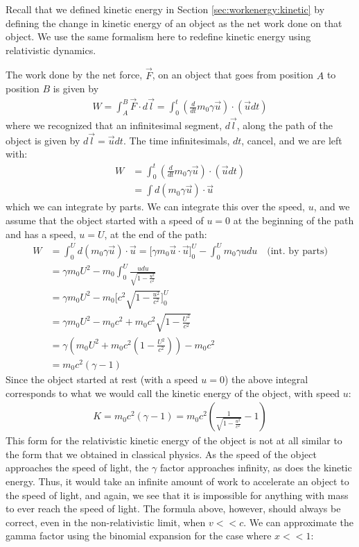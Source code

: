 Recall that we defined kinetic energy in Section \ref{sec:workenergy:kinetic} by defining the change in kinetic energy of an object as the net work done on that object. We use the same formalism here to redefine kinetic energy using relativistic dynamics.

The work done by the net force, $\vec F$, on an object that goes from position $A$ to position $B$ is given by
\begin{align*}
W = \int_A^B \vec F\cdot d\vec l=\int_0^t \left(\frac{d}{dt}m_0\gamma\vec u \right)\cdot(\vec u dt)
\end{align*}
where we recognized that an infinitesimal segment, $d\vec l$, along the path of the object is given by $d\vec l=\vec u dt$. The time infinitesimals, $dt$, cancel, and we are left with:
\begin{align*}
W&=\int_0^t \left(\frac{d}{dt}m_0\gamma\vec u \right)\cdot(\vec u dt)\\
&=\int d(m_0\gamma \vec u)\cdot \vec u
\end{align*}
which we can integrate by parts. We can integrate this over the speed, $u$, and we assume that the object started with a speed of $u=0$ at the beginning of the path and has a speed, $u=U$, at the end of the path:
\begin{align*}
W&=\int_0^U d(m_0\gamma \vec u)\cdot \vec u = \Big[\gamma m_0 \vec u\cdot\vec u\Big]_0^U-\int_0^U m_0\gamma u du\quad\text{(int. by parts)}\\
&=\gamma m_0 U^2-m_0\int_0^U\frac{udu}{\sqrt{1-\frac{u^2}{c^2}}}\\
&=\gamma m_0 U^2-m_0\Big[ c^2\sqrt{1-\frac{u^2}{c^2}} \Big]_0^U\\
&=\gamma m_0 U^2-m_0c^2+m_0c^2\sqrt{1-\frac{U^2}{c^2}}\\
&=\gamma \left(m_0 U^2+m_0c^2\left(1-\frac{U^2}{c^2}\right)\right)-m_0c^2\\
&=m_0c^2(\gamma -1)	
\end{align*}
Since the object started at rest (with a speed $u=0$) the above integral corresponds to what we would call the kinetic energy of the object, with speed $u$:
\begin{align*}
K=m_0c^2(\gamma -1)=m_0c^2\left(\frac{1}{\sqrt{1-\frac{u^2}{c^2}}}-1\right)
\end{align*}
This form for the relativistic kinetic energy of the object is not at all similar to the form that we obtained in classical physics. As the speed of the object approaches the speed of light, the $\gamma$ factor approaches infinity, as does the kinetic energy. Thus, it would take an infinite amount of work to accelerate an object to the speed of light, and again, we see that it is impossible for anything with mass to ever reach the speed of light. The formula above, however, should always be correct, even in the non-relativistic limit, when $v<<c$. We can approximate the gamma factor using the binomial expansion for the case where $x<<1$:
